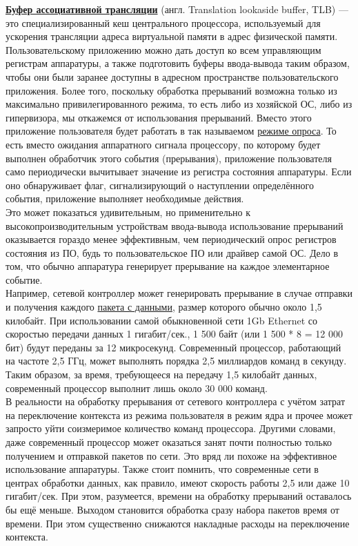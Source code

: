 \documentclass[14pt, a4paper]{article}
\begin{document}
\href{https://ru.wikipedia.org/wiki/Буфер_ассоциативной_трансляции}{\textbf{Буфер ассоциативной трансляции}} (англ. Translation lookaside buffer, TLB) — это специализированный
кеш центрального процессора, используемый для ускорения трансляции адреса виртуальной памяти
в адрес физической памяти.\\

Пользовательскому приложению можно дать доступ ко всем управляющим регистрам аппаратуры, а
также подготовить буферы ввода-вывода таким образом, чтобы они были заранее доступны в
адресном пространстве пользовательского приложения. Более того, поскольку обработка прерываний
возможна только из максимально привилегированного режима, то есть либо из хозяйской ОС, либо из
гипервизора, мы откажемся от использования прерываний. Вместо этого приложение пользователя
будет работать в так называемом \href{https://en.wikipedia.org/wiki/Polling_(computer_science)}{режиме опроса}. То есть вместо ожидания аппаратного сигнала
процессору, по которому будет выполнен обработчик этого события (прерывания), приложение
пользователя само периодически вычитывает значение из регистра состояния аппаратуры. Если оно
обнаруживает флаг, сигнализирующий о наступлении определённого события, приложение выполняет
необходимые действия.\\

Это может показаться удивительным, но применительно к высокопроизводительным устройствам
ввода-вывода использование прерываний оказывается гораздо менее эффективным, чем
периодический опрос регистров состояния из ПО, будь то пользовательское ПО или драйвер самой
ОС. Дело в том, что обычно аппаратура генерирует прерывание на каждое элементарное событие.\\

Например, сетевой контроллер может генерировать прерывание в случае отправки и получения
каждого \href{https://ru.wikipedia.org/wiki/Maximum_transmission_unit}{пакета с данными}, размер которого обычно около 1,5 килобайт. При использовании самой
обыкновенной сети 1Gb Ethernet со скоростью передачи данных 1 гигабит/сек., 1 500 байт (или 1 500 *
8 = 12 000 бит) будут переданы за 12 микросекунд. Современный процессор, работающий на частоте
2,5 ГГц, может выполнять порядка 2,5 миллиардов команд в секунду. Таким образом, за время,
требующееся на передачу 1,5 килобайт данных, современный процессор выполнит лишь около 30 000
команд.\\

В реальности на обработку прерывания от сетевого контроллера с учётом затрат на переключение
контекста из режима пользователя в режим ядра и прочее может запросто уйти соизмеримое
количество команд процессора. Другими словами, даже современный процессор может оказаться
занят почти полностью только получением и отправкой пакетов по сети. Это вряд ли похоже на
эффективное использование аппаратуры. Также стоит помнить, что современные сети в центрах
обработки данных, как правило, имеют скорость работы 2,5 или даже 10 гигабит/сек. При этом,
разумеется, времени на обработку прерываний оставалось бы ещё меньше. Выходом становится
обработка сразу набора пакетов время от времени. При этом существенно снижаются накладные
расходы на переключение контекста.\\
\end{document}
